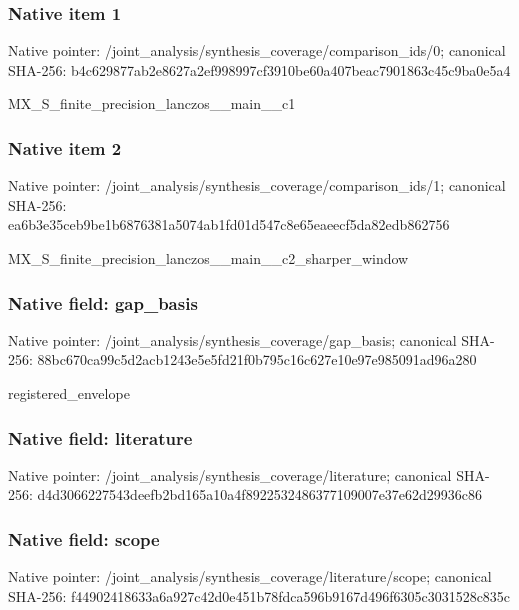 \documentclass[10pt,a4paper]{article}
\begin{document}
\subsubsection{Native item 1}
Native pointer: /joint\_\allowbreak{}analysis/synthesis\_\allowbreak{}coverage/comparison\_\allowbreak{}ids/0; canonical SHA-256: b4c629877ab2e8627a2ef998997cf3910be60a407beac7901863c45c9ba0e5a4

\begingroup\raggedright\sloppy MX\_\allowbreak{}S\_\allowbreak{}finite\_\allowbreak{}precision\_\allowbreak{}lanczos\_\allowbreak{}\_\allowbreak{}main\_\allowbreak{}\_\allowbreak{}c1\par\endgroup

\subsubsection{Native item 2}
Native pointer: /joint\_\allowbreak{}analysis/synthesis\_\allowbreak{}coverage/comparison\_\allowbreak{}ids/1; canonical SHA-256: ea6b3e35ceb9be1b6876381a5074ab1fd01d547c8e65eaeecf5da82edb862756

\begingroup\raggedright\sloppy MX\_\allowbreak{}S\_\allowbreak{}finite\_\allowbreak{}precision\_\allowbreak{}lanczos\_\allowbreak{}\_\allowbreak{}main\_\allowbreak{}\_\allowbreak{}c2\_\allowbreak{}sharper\_\allowbreak{}window\par\endgroup

\subsubsection{Native field: gap\_\allowbreak{}basis}
Native pointer: /joint\_\allowbreak{}analysis/synthesis\_\allowbreak{}coverage/gap\_\allowbreak{}basis; canonical SHA-256: 88bc670ca99c5d2acb1243e5e5fd21f0b795c16c627e10e97e985091ad96a280

\begingroup\raggedright\sloppy registered\_\allowbreak{}envelope\par\endgroup

\subsubsection{Native field: literature}
Native pointer: /joint\_\allowbreak{}analysis/synthesis\_\allowbreak{}coverage/literature; canonical SHA-256: d4d3066227543deefb2bd165a10a4f8922532486377109007e37e62d29936c86

\subsubsection{Native field: scope}
Native pointer: /joint\_\allowbreak{}analysis/synthesis\_\allowbreak{}coverage/literature/scope; canonical SHA-256: f44902418633a6a927c42d0e451b78fdca596b9167d496f6305c3031528c835c
\end{document}
